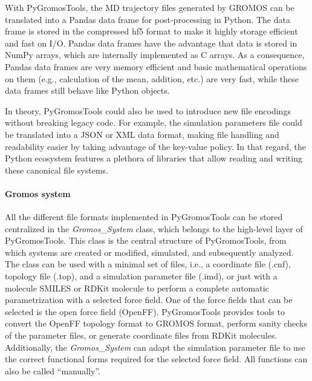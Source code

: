 With PyGromosTools, the MD trajectory files generated by GROMOS can be translated into a Pandas data frame for post-processing in Python. The data frame is stored in the compressed hf5 format \cite{Hf52020} to make it highly storage efficient and fast on I/O. Pandas data frames have the advantage that data is stored in NumPy arrays, which are internally implemented as C arrays. As a consequence, Pandas data frames are very memory efficient and basic mathematical operations on them (e.g., calculation of the mean, addition, etc.) are very fast, while these data frames still behave like Python objects.

In theory, PyGromosTools could also be used to introduce new file encodings without breaking legacy code. For example, the simulation parameters file could be translated into a JSON\cite{Pezoa2016} or XML\cite{Bray2008} data format, making file handling and readability easier by taking advantage of the key-value policy. In that regard, the Python ecosystem features a plethora of libraries that allow reading and writing these canonical file systems.


\paragraph{Gromos system}
All the different file formats implemented in PyGromosTools can be stored centralized in the \textit{Gromos\_System} class, which belongs to the high-level layer of PyGromosTools. This class is the central structure of PyGromosTools, from which systems are created or modified, simulated, and subsequently analyzed. The class can be used with a minimal set of files, i.e., a coordinate file (.cnf), topology file (.top), and a simulation parameter file (.imd), or just with a molecule SMILES or RDKit molecule to perform a complete automatic parametrization with a selected force field.
%
One of the force fields that can be selected is the open force field (OpenFF).\cite{Qiu2021} PyGromosTools provides tools to convert the OpenFF topology format to GROMOS format, perform sanity checks of the parameter files, or generate coordinate files from RDKit molecules. Additionally, the \textit{Gromos\_System} can adapt the simulation parameter file to use the correct functional forms required for the selected force field.
All functions can also be called ``manually''.

